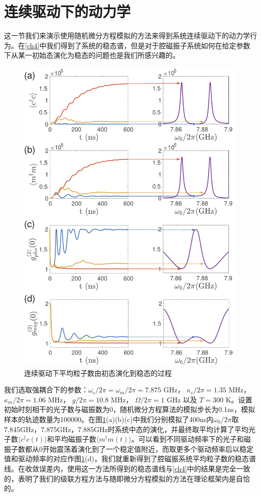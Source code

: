 \section{连续驱动下的动力学}
这一节我们来演示使用随机微分方程模拟的方法来得到系统连续驱动下的动力学行为。在\ref{ch4}中我们得到了系统的稳态谱，但是对于腔磁振子系统如何在给定参数下从某一初始态演化为稳态的问题也是我们所感兴趣的。
\begin{figure}[htbp]
	\centering
	\includegraphics[width=2\basefigurewidth,clip]{./figure/5_1}
	\caption{连续驱动下平均粒子数由初态演化到稳态的过程} 
	\label{ContinuiousDrive2edOrder}
\end{figure}
我们选取强耦合下的参数：$\omega_c/2\pi=\omega_m/2\pi=7.875$ GHz， $\kappa_c/2\pi=1.35$ MHz， $\kappa_m/2\pi=1.06$ MHz， $g/2\pi=10.8$ MHz， $\Omega/2\pi=1$ GHz 以及 $T=300$ K。设置初始时刻相干的光子数与磁振数为0，随机微分方程算法的模拟步长为0.1ns，模拟样本的轨迹数量为100000。在图\ref{ContinuiousDrive2edOrder}(a)(b)(c)中我们分别模拟了400ns内$\omega_0/2\pi$取7.845GHz，7.875GHz，7.885GHz时系统中态的演化，并最终取平均计算了平均光子数$\langle c^{\dag}c(t)\rangle$和平均磁振子数$\langle m^{\dag}m(t)\rangle$。可以看到不同驱动频率下的光子和磁振子数都从0开始震荡着演化到了一个稳定值附近，而取更多个驱动频率后以稳定值和驱动频率的对应作图\ref{ContinuiousDrive2edOrder}(d)，我们就重新得到了腔磁振系统平均粒子数的稳态谱线。在收敛误差内，使用这一方法所得到的稳态谱线与\ref{ch4}中的结果是完全一致的，表明了我们的级联方程方法与随即微分方程模拟的方法在理论框架内是自恰的。

